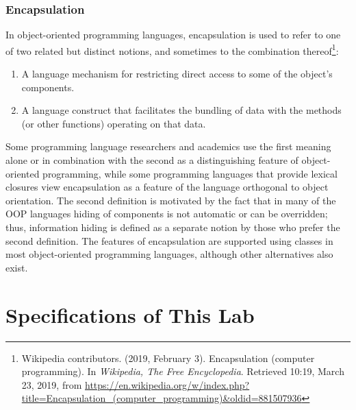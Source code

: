 \documentclass[a4paper]{report}
\begin{document}
\subsection{Encapsulation}
In object-oriented programming languages, encapsulation is used to refer to one of two related but distinct notions, and sometimes to the combination thereof\footnote{Wikipedia contributors. (2019, February 3). Encapsulation (computer programming). In \emph{Wikipedia, The Free Encyclopedia}. Retrieved 10:19, March 23, 2019, from \url{https://en.wikipedia.org/w/index.php?title=Encapsulation_(computer_programming)&oldid=881507936}}: 
\begin{enumerate}
\item A language mechanism for restricting direct access to some of the object's components.
\item A language construct that facilitates the bundling of data with the methods (or other functions) operating on that data.
\end{enumerate}
Some programming language researchers and academics use the first meaning alone or in combination with the second as a distinguishing feature of object-oriented programming, while some programming languages that provide lexical closures view encapsulation as a feature of the language orthogonal to object orientation. 
The second definition is motivated by the fact that in many of the OOP languages hiding of components is not automatic or can be overridden; thus, information hiding is defined as a separate notion by those who prefer the second definition. 
The features of encapsulation are supported using classes in most object-oriented programming languages, although other alternatives also exist. 

\chapter{Specifications of This Lab}
\end{document}
